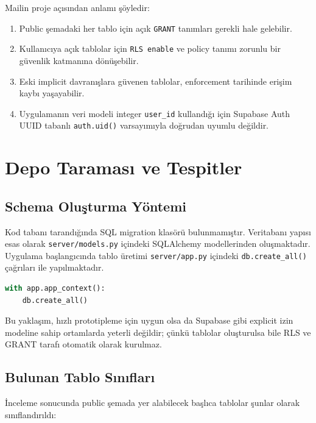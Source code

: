 \documentclass[12pt,a4paper]{article}
\begin{document}
Mailin proje açısından anlamı şöyledir:

\begin{enumerate}[leftmargin=2em]
	\item Public şemadaki her tablo için açık \texttt{GRANT} tanımları gerekli hale gelebilir.
	\item Kullanıcıya açık tablolar için \texttt{RLS enable} ve policy tanımı zorunlu bir güvenlik katmanına dönüşebilir.
	\item Eski implicit davranışlara güvenen tablolar, enforcement tarihinde erişim kaybı yaşayabilir.
	\item Uygulamanın veri modeli integer \texttt{user\_id} kullandığı için Supabase Auth UUID tabanlı \texttt{auth.uid()} varsayımıyla doğrudan uyumlu değildir.
\end{enumerate}

\section{Depo Taraması ve Tespitler}

\subsection{Schema Oluşturma Yöntemi}

Kod tabanı tarandığında SQL migration klasörü bulunmamıştır. Veritabanı yapısı esas olarak \texttt{server/models.py} içindeki SQLAlchemy modellerinden oluşmaktadır. Uygulama başlangıcında tablo üretimi \texttt{server/app.py} içindeki \texttt{db.create\_all()} çağrıları ile yapılmaktadır.

\begin{lstlisting}[language=Python, caption={Şema oluşturmanın mevcut yolu}]
with app.app_context():
	db.create_all()
\end{lstlisting}

Bu yaklaşım, hızlı prototipleme için uygun olsa da Supabase gibi explicit izin modeline sahip ortamlarda yeterli değildir; çünkü tablolar oluşturulsa bile RLS ve GRANT tarafı otomatik olarak kurulmaz.

\subsection{Bulunan Tablo Sınıfları}

İnceleme sonucunda public şemada yer alabilecek başlıca tablolar şunlar olarak sınıflandırıldı:
\end{document}
